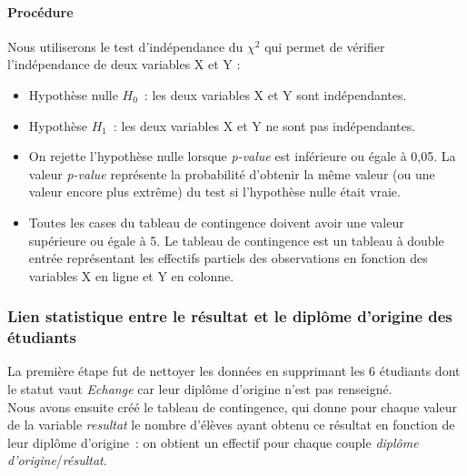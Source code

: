 \documentclass[a4paper,12pt]{report}
\begin{document}
\paragraph{Procédure}

Nous utiliserons le test d'indépendance du $\chi^2$ qui permet de vérifier l'indépendance de deux variables X et Y : 

\begin{itemize}
	\item Hypothèse nulle $H_{0}$~: les deux variables X et Y sont indépendantes.
	\item Hypothèse $H_{1}$~: les deux variables X et Y ne sont pas indépendantes.
	\item On rejette l'hypothèse nulle lorsque \textit{p-value} est inférieure ou égale à 0,05. La valeur \textit{p-value} représente la probabilité d'obtenir la même valeur (ou une valeur encore plus extrême) du test si l'hypothèse nulle était vraie.
	\item Toutes les cases du tableau de contingence doivent avoir une valeur supérieure ou égale à 5. Le tableau de contingence est un tableau à double entrée représentant les effectifs partiels des observations en fonction des variables X en ligne et Y en colonne.
\end{itemize}



\subsubsection{Lien statistique entre le résultat et le diplôme d'origine des étudiants}
La première étape fut de nettoyer les données en supprimant les 6 étudiants dont le statut vaut \textit{Echange} car leur diplôme d'origine n'est pas renseigné.\\
Nous avons ensuite créé le tableau de contingence, qui donne pour chaque valeur de la variable \textit{resultat} le nombre d'élèves ayant obtenu ce résultat en fonction de leur diplôme d'origine~: on obtient un effectif pour chaque couple \textit{diplôme d'origine}/\textit{résultat}.
\end{document}

